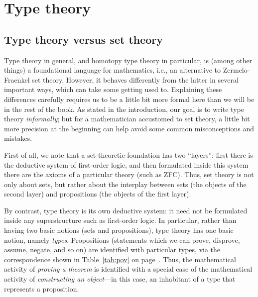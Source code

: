 {%

\newcommand{\stype}{{\;\sf type}}
\newcommand{\app}{{\sf app}}
\newcommand{\inleft}{{\sf inleft}}
\newcommand{\inright}{{\sf inright}}
\newcommand{\unitt}{{\bf 1}}



\chapter{Type theory}
\label{cha:typetheory}

\section{Type theory versus set theory}
\label{sec:types-vs-sets}

Type theory in general, and homotopy type theory in particular, is (among other things) a foundational language for mathematics, i.e., an alternative to Zermelo-Fraenkel set theory.
However, it behaves differently from the latter in several important ways, which can take some getting used to.
Explaining these differences carefully requires us to be a little bit more formal here than we will be in the rest of the book.
As stated in the introduction, our goal is to write type theory \emph{informally}; but for a mathematician accustomed to set theory, a little bit more precision at the beginning can help avoid some common misconceptions and mistakes.

First of all, we note that a set-theoretic foundation has two ``layers'': first there is the deductive system of first-order logic, and then formulated inside this system there are the axioms of a particular theory (such as ZFC).
Thus, set theory is not only about sets, but rather about the interplay between sets (the objects of the second layer) and propositions (the objects of the first layer).

By contrast, type theory is its own deductive system: it need not be formulated inside any superstructure such as first-order logic.
In particular, rather than having two basic notions (sets and propositions), type theory has one basic notion, namely \emph{types}.
Propositions (statements which we can prove, disprove, assume, negate, and so on) are identified with particular types, via the correspondence shown in Table~\ref{tab:pov} on page~\pageref{tab:pov}.
Thus, the mathematical activity of \emph{proving a theorem} is identified with a special case of the mathematical activity of \emph{constructing an object}---in this case, an inhabitant of a type that represents a proposition.

}
